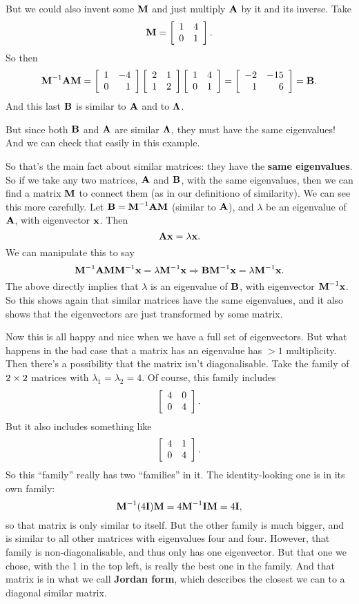 But we could also invent some $\mM$ and just multiply $\mA$ by it and its inverse. Take 
\[\mM = \mat{1&4\\0&1}. \]
So then
\[ \mM^{-1} \mA \mM = \mat{1&-4\\0&1}\mat{2&1\\1&2}\mat{1&4\\0&1} = \mat{-2&-15\\1&6} = \mB. \]
And this last $\mB$ is similar to $\mA$ and to $\mLa$. 

But since both $\mB$ and $\mA$ are similar $\mLa$, they must have the same eigenvalues! And we can check that easily in this example.
\eex

So that's the main fact about similar matrices: they have the \textbf{same eigenvalues}. So if we take any two matrices, $\mA$ and $\mB$, with the same eigenvalues, then we can find a matrix $\mM$ to connect them (as in our definitiono of similarity). We can see this more carefully. Let $\mB = \mM^{-1} \mA \mM$ (similar to $\mA$), and $\lambda$ be an eigenvalue of $\mA$, with eigenvector $\vx$. Then
\[ \mA \vx = \lambda \vx. \]
We can manipulate this to say
\[ \mM^{-1} \mA \mM \mM^{-1} \vx = \lambda \mM^{-1} \vx \Rightarrow \mB \mM^{-1} \vx = \lambda \mM^{-1} \vx. \]
The above directly implies that $\lambda$ is an eigenvalue of $\mB$, with eigenvector $\mM^{-1} \vx$. So this shows again that similar matrices have the same eigenvalues, and it also shows that the eigenvectors are just transformed by some matrix.

Now this is all happy and nice when we have a full set of eigenvectors. But what happens in the bad case that a matrix has an eigenvalue has $>1$ multiplicity. Then there's a possibility that the matrix isn't diagonalisable.
\bex
Take the family of $2 \by 2$ matrices with $\lambda_1 = \lambda_2 = 4$. Of course, this family includes
\[ \mat{4&0\\0&4}. \]
But it also includes something like
\[ \mat{4&1\\0&4}. \]
So this ``family'' really has two ``families'' in it. The identity-looking one is in its own family:
\[ \mM^{-1} (4\mI) \mM = 4 \mM^{-1} \mI \mM = 4 \mI, \]
so that matrix is only similar to itself. But the other family is much bigger, and is similar to all other matrices with eigenvalues four and four. However, that family is non-diagonalisable, and thus only has one eigenvector. But that one we chose, with the 1 in the top left, is really the best one in the family. And that matrix is in what we call \textbf{Jordan form}, which describes the closest we can to a diagonal similar matrix. 

